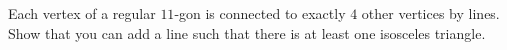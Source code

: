 Each vertex of a regular $11$-gon is connected to exactly $4$ other vertices by lines.
Show that you can add a line such that there is at least one isosceles triangle.